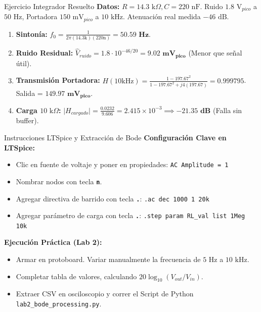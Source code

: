 \documentclass[aspectratio=169, 10pt]{beamer}
\begin{document}
\begin{frame}{Ejercicio Integrador Resuelto}
    \textbf{Datos:} $R = 14.3\text{ k}\Omega, C = 220\text{ nF}$. Ruido $1.8\text{ V}_{pico}$ a $50\text{ Hz}$, Portadora $150\text{ mV}_{pico}$ a $10\text{ kHz}$. Atenuación real medida $-46\text{ dB}$.
    \vspace{0.3cm}
    \begin{enumerate}
        \setlength{\itemsep}{8pt}
        \item \textbf{Sintonía:} $f_0 = \frac{1}{2\pi (14.3\text{k})(220\text{n})} = \mathbf{50.59\text{ Hz}}$.
        \item \textbf{Ruido Residual:} $\hat{V}_{ruido} = 1.8 \cdot 10^{-46/20} = \mathbf{9.02\text{ mV}_{pico}}$ (Menor que señal útil).
        \item \textbf{Transmisión Portadora:} $H(10\text{kHz}) = \frac{1 - 197.67^2}{1 - 197.67^2 + j4(197.67)} = \mathbf{0.999795}$. Salida = $\mathbf{149.97\text{ mV}_{pico}}$.
        \item \textbf{Carga $10\text{ k}\Omega$:} $\vert{}H_{cargado}\vert{} = \frac{0.0232}{9.606} = 2.415 \times 10^{-3} \implies \mathbf{-21.35\text{ dB}}$ (Falla sin buffer).
    \end{enumerate}
\end{frame}

\begin{frame}[fragile]{Instrucciones LTSpice y Extracción de Bode}
    \textbf{Configuración Clave en LTSpice:}
    \vspace{0.2cm}
    \begin{itemize}
        \setlength{\itemsep}{4pt}
        \item Clic en fuente de voltaje y poner en propiedades: \texttt{\color{purple}AC Amplitude = 1}
        \item Nombrar nodos con tecla \colorbox{gray!20}{\texttt{\footnotesize\textbf{n}}}.
        \item Agregar directiva de barrido con tecla \colorbox{gray!20}{\texttt{\footnotesize\textbf{.}}}: \texttt{\color{purple}.ac dec 1000 1 20k}
        \item Agregar parámetro de carga con tecla \colorbox{gray!20}{\texttt{\footnotesize\textbf{.}}}: \texttt{\color{purple}.step param RL\_val list 1Meg 10k}
    \end{itemize}
    \vspace{0.3cm}
    \textbf{Ejecución Práctica (Lab 2):}
    \begin{itemize}
        \item Armar en protoboard. Variar manualmente la frecuencia de $5\text{ Hz}$ a $10\text{ kHz}$.
        \item Completar tabla de valores, calculando $20\log_{10}(V_{out}/V_{in})$.
        \item Extraer CSV en osciloscopio y correr el Script de Python \texttt{lab2\_bode\_processing.py}.
    \end{itemize}
\end{frame}
\end{document}
